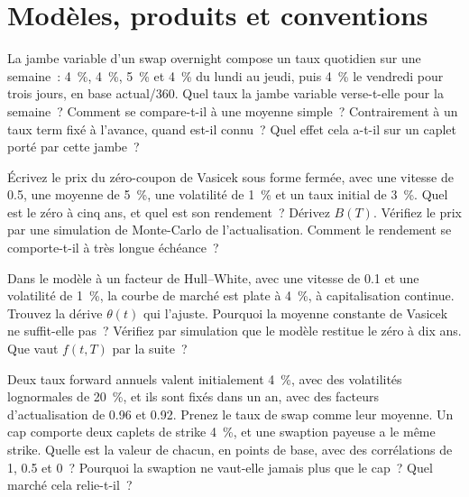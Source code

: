 \section{Modèles, produits et conventions}

\begin{question}\label{iq:iv2:rates-and-fx:34}
La jambe variable d'un swap overnight compose un taux quotidien sur une semaine~: 4~\%, 4~\%, 5~\% et 4~\% du lundi au jeudi, puis 4~\% le vendredi pour trois jours, en base actual/360. Quel taux la jambe variable verse-t-elle pour la semaine~? Comment se compare-t-il à une moyenne simple~? Contrairement à un taux term fixé à l'avance, quand est-il connu~? Quel effet cela a-t-il sur un caplet porté par cette jambe~?
\end{question}

\begin{question}\label{iq:iv2:rates-and-fx:35}
Écrivez le prix du zéro-coupon de Vasicek sous forme fermée, avec une vitesse de 0.5, une moyenne de 5~\%, une volatilité de 1~\% et un taux initial de 3~\%. Quel est le zéro à cinq ans, et quel est son rendement~? Dérivez $B(T)$. Vérifiez le prix par une simulation de Monte-Carlo de l'actualisation. Comment le rendement se comporte-t-il à très longue échéance~?
\end{question}

\begin{question}\label{iq:iv2:rates-and-fx:36}
Dans le modèle à un facteur de Hull--White, avec une vitesse de 0.1 et une volatilité de 1~\%, la courbe de marché est plate à 4~\%, à capitalisation continue. Trouvez la dérive $\theta(t)$ qui l'ajuste. Pourquoi la moyenne constante de Vasicek ne suffit-elle pas~? Vérifiez par simulation que le modèle restitue le zéro à dix ans. Que vaut $f(t,T)$ par la suite~?
\end{question}

\begin{question}\label{iq:iv2:rates-and-fx:37}
Deux taux forward annuels valent initialement 4~\%, avec des volatilités lognormales de 20~\%, et ils sont fixés dans un an, avec des facteurs d'actualisation de 0.96 et 0.92. Prenez le taux de swap comme leur moyenne. Un cap comporte deux caplets de strike 4~\%, et une swaption payeuse a le même strike. Quelle est la valeur de chacun, en points de base, avec des corrélations de 1, 0.5 et 0~? Pourquoi la swaption ne vaut-elle jamais plus que le cap~? Quel marché cela relie-t-il~?
\end{question}

